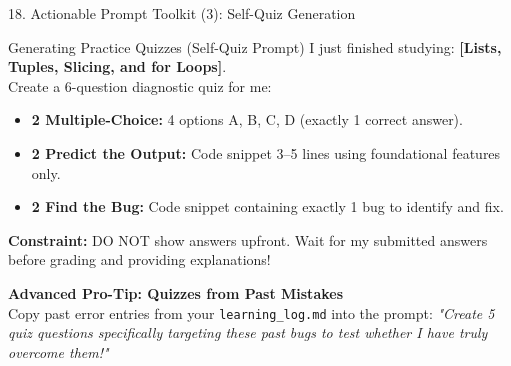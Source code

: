 \documentclass[aspectratio=169, 10pt]{beamer}
\begin{document}
\begin{frame}{18. Actionable Prompt Toolkit (3): Self-Quiz Generation}
  \begin{cbox}[primaryblue]{Generating Practice Quizzes (Self-Quiz Prompt)}
    \footnotesize
    I just finished studying: \textbf{[Lists, Tuples, Slicing, and for Loops]}.\\[3pt]
    Create a 6-question diagnostic quiz for me:
    \begin{itemize}\setlength{\itemsep}{2pt}
      \item \textbf{2 Multiple-Choice:} 4 options A, B, C, D (exactly 1 correct answer).
      \item \textbf{2 Predict the Output:} Code snippet 3--5 lines using foundational features only.
      \item \textbf{2 Find the Bug:} Code snippet containing exactly 1 bug to identify and fix.
    \end{itemize}
    \vspace{2pt}
    \textbf{Constraint:} DO NOT show answers upfront. Wait for my submitted answers before grading and providing explanations!
  \end{cbox}
  \vspace{0.15cm}
  \begin{tcolorbox}[colback=secondarygreen!8, colframe=secondarygreen, arc=3pt, left=8pt, right=8pt, top=3pt, bottom=3pt]
    \textbf{\footnotesize Advanced Pro-Tip: Quizzes from Past Mistakes}\\
    \footnotesize Copy past error entries from your \texttt{learning\_log.md} into the prompt: \textit{"Create 5 quiz questions specifically targeting these past bugs to test whether I have truly overcome them!"}
  \end{tcolorbox}
\end{frame}
\end{document}
